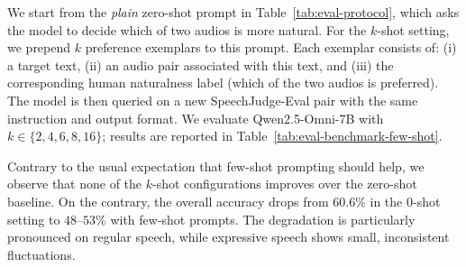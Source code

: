 \documentclass[]{bytedance_seed}
\begin{document}
\begin{table}[ht]
    \caption{Performance of Qwen2.5-Omni-7B on SpeechJudge-Eval with different $k$-shot prompts.}
    \vspace{-2mm}
    \label{tab:eval-benchmark-few-shot}
    \centering
\end{table}

We start from the \textit{plain} zero-shot prompt in Table~\ref{tab:eval-protocol},
which asks the model to decide which of two audios is more natural.
For the $k$-shot setting, we prepend $k$ preference exemplars to this prompt.
Each exemplar consists of:
(i) a target text,
(ii) an audio pair associated with this text, and
(iii) the corresponding human naturalness label (which of the two audios is
preferred).
The model is then queried on a new SpeechJudge-Eval pair with the same
instruction and output format.
We evaluate Qwen2.5-Omni-7B with $k\in\{2,4,6,8,16\}$; results are reported in
Table~\ref{tab:eval-benchmark-few-shot}.

Contrary to the usual expectation that few-shot prompting should help,
we observe that none of the $k$-shot configurations improves over the
zero-shot baseline.
On the contrary, the overall accuracy drops from $60.6\%$ in the 0-shot
setting to $48$--$53\%$ with few-shot prompts.
The degradation is particularly pronounced on regular speech, while expressive
speech shows small, inconsistent fluctuations.
\end{document}
